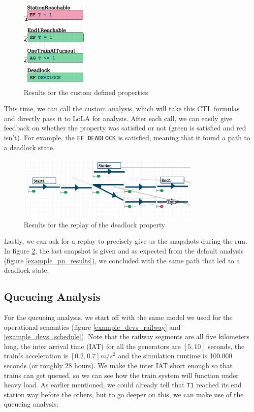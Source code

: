 \documentclass{article}
\begin{document}
\begin{figure}[H]
    \centering
    \includegraphics[width=0.3\textwidth]{images/custom_properties_result.png}
    \caption{Results for the custom defined properties}
    \label{custom_properties_results}
\end{figure}

This time, we can call the custom analysis, which will take this CTL formulas and directly pass it to LoLA for analysis. After each call, we can easily give feedback on whether the property was satisfied or not (green is satisfied and red isn't). For example, the \texttt{EF DEADLOCK} is satisfied, meaning that it found a path to a deadlock state.

\begin{figure}[H]
    \centering
    \includegraphics[width=0.8\textwidth]{images/custom_properties_replay.png}
    \caption{Results for the replay of the deadlock property}
    \label{custom_properties_replay}
\end{figure}

Lastly, we can ask for a replay to precisely give us the snapshots during the run. In figure \ref{custom_properties_replay}, the last snapshot is given and as expected from the default analysis (figure \ref{example_pn_results}), we concluded with the same path that led to a deadlock state.

\subsection*{Queueing Analysis}
\label{queueing_analysis_section}

For the queueing analysis, we start off with the same model we used for the operational semantics (figure \ref{example_devs_railway} and \ref{example_devs_schedule}). Note that the railway segments are all five kilometers long, the inter arrival time (IAT) for all the generators are $[5,10]$ seconds, the train's acceleration is $[0.2,0.7] m/s^2$ and the simulation runtime is 100.000 seconds (or roughly 28 hours). We make the inter IAT short enough so that trains can get queued, so we can see how the train system will function under heavy load. As earlier mentioned, we could already tell that \texttt{T1} reached its end station way before the others, but to go deeper on this, we can make use of the queueing analysis.
\end{document}
